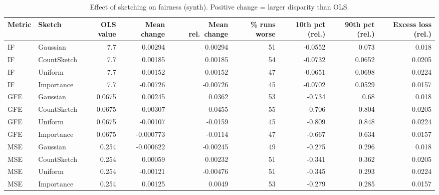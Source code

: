 \begin{table}[t]
\centering
\small
\begin{tabular}{llrrrrrrr}
\toprule
Metric & Sketch & OLS value & Mean change & Mean rel.\ change & \% runs worse & 10th pct (rel.) & 90th pct (rel.) & Excess loss (rel.) \\
\midrule
IF & Gaussian & 7.7 & 0.00294 & 0.00294 & 51 & -0.0552 & 0.073 & 0.018 \\
IF & CountSketch & 7.7 & 0.00185 & 0.00185 & 54 & -0.0732 & 0.0652 & 0.0205 \\
IF & Uniform & 7.7 & 0.00152 & 0.00152 & 47 & -0.0651 & 0.0698 & 0.0224 \\
IF & Importance & 7.7 & -0.00726 & -0.00726 & 45 & -0.0702 & 0.0529 & 0.0157 \\
\midrule
GFE & Gaussian & 0.0675 & 0.00245 & 0.0362 & 53 & -0.734 & 0.68 & 0.018 \\
GFE & CountSketch & 0.0675 & 0.00307 & 0.0455 & 55 & -0.706 & 0.804 & 0.0205 \\
GFE & Uniform & 0.0675 & -0.00107 & -0.0159 & 45 & -0.809 & 0.848 & 0.0224 \\
GFE & Importance & 0.0675 & -0.000773 & -0.0114 & 47 & -0.667 & 0.634 & 0.0157 \\
\midrule
MSE & Gaussian & 0.254 & -0.000622 & -0.00245 & 49 & -0.275 & 0.296 & 0.018 \\
MSE & CountSketch & 0.254 & 0.00059 & 0.00232 & 51 & -0.341 & 0.362 & 0.0205 \\
MSE & Uniform & 0.254 & -0.00121 & -0.00476 & 51 & -0.345 & 0.293 & 0.0224 \\
MSE & Importance & 0.254 & 0.00125 & 0.0049 & 53 & -0.279 & 0.285 & 0.0157 \\
\bottomrule
\end{tabular}
\caption{Effect of sketching on fairness (synth). Positive change = larger disparity than OLS.}
\label{tab:harm_synth}
\end{table}
